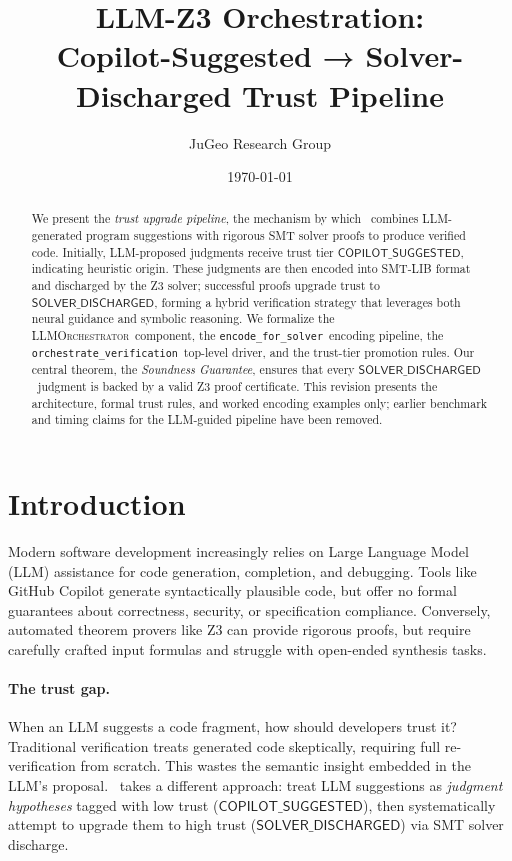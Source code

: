 \documentclass[11pt]{article}
\title{\textbf{LLM-Z3 Orchestration:\\
Copilot-Suggested → Solver-Discharged Trust Pipeline}}
\author{%
  JuGeo Research Group
}
\date{\today}
\newcommand{\LLMOrch}{\textsc{LLMOrchestrator}}
\newcommand{\CopilotSugg}{\ensuremath{\mathsf{COPILOT\_SUGGESTED}}}
\newcommand{\SolverDisch}{\ensuremath{\mathsf{SOLVER\_DISCHARGED}}}
\newcommand{\OrchestrateVerif}{\texttt{orchestrate\_verification}}
\newcommand{\EncodeForSolver}{\texttt{encode\_for\_solver}}
\begin{document}
\maketitle

\begin{abstract}
We present the \emph{trust upgrade pipeline}, the mechanism by which \JuGeo\
combines LLM-generated program suggestions with rigorous SMT solver proofs to
produce verified code. Initially, LLM-proposed judgments receive trust tier
\CopilotSugg, indicating heuristic origin. These judgments are then encoded
into SMT-LIB format and discharged by the Z3 solver; successful proofs upgrade
trust to \SolverDisch, forming a hybrid verification strategy that leverages
both neural guidance and symbolic reasoning. We formalize the \LLMOrch\
component, the \EncodeForSolver\ encoding pipeline, the \OrchestrateVerif\
top-level driver, and the trust-tier promotion rules. Our central theorem,
the \emph{Soundness Guarantee}, ensures that every \SolverDisch\ judgment
is backed by a valid Z3 proof certificate. This revision presents the
architecture, formal trust rules, and worked encoding examples only; earlier
benchmark and timing claims for the LLM-guided pipeline have been removed.
\end{abstract}

\newpage

\section{Introduction}\label{sec:intro}

Modern software development increasingly relies on Large Language Model (LLM) 
assistance for code generation, completion, and debugging. Tools like GitHub 
Copilot generate syntactically plausible code, but offer no formal guarantees 
about correctness, security, or specification compliance. Conversely, automated 
theorem provers like Z3 can provide rigorous proofs, but require carefully 
crafted input formulas and struggle with open-ended synthesis tasks.

\paragraph{The trust gap.}
When an LLM suggests a code fragment, how should developers trust it? 
Traditional verification treats generated code skeptically, requiring full 
re-verification from scratch. This wastes the semantic insight embedded in 
the LLM's proposal. \JuGeo\ takes a different approach: treat LLM suggestions 
as \emph{judgment hypotheses} tagged with low trust (\CopilotSugg), then 
systematically attempt to upgrade them to high trust (\SolverDisch) via 
SMT solver discharge.
\end{document}
